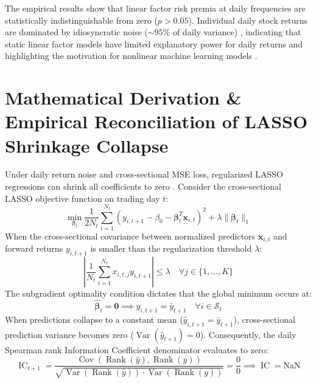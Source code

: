 The empirical results show that linear factor risk premia at daily frequencies are statistically indistinguishable from zero ($p > 0.05$). Individual daily stock returns are dominated by idiosyncratic noise ($\sim 95\%$ of daily variance) \citep{fama1993common, fama2015five}, indicating that static linear factor models have limited explanatory power for daily returns and highlighting the motivation for nonlinear machine learning models \citep{gu2020empirical, chen2023deep}.

\section{Mathematical Derivation \& Empirical Reconciliation of LASSO Shrinkage Collapse}
Under daily return noise and cross-sectional MSE loss, regularized LASSO regressions can shrink all coefficients to zero \citep{tibshirani1996regression, kozak2020shrinking}. Consider the cross-sectional LASSO objective function on trading day $t$:
\begin{equation}
\min_{\boldsymbol{\beta}_t} \frac{1}{2N_t} \sum_{i=1}^{N_t} \left( y_{i,t+1} - \beta_0 - \boldsymbol{\beta}_t^T \mathbf{x}_{i,t} \right)^2 + \lambda \|\boldsymbol{\beta}_t\|_1
\label{eq:ch4_lasso_obj}
\end{equation}
When the cross-sectional covariance between normalized predictors $\mathbf{x}_{i,t}$ and forward returns $y_{i,t+1}$ is smaller than the regularization threshold $\lambda$:
\begin{equation}
\left| \frac{1}{N_t} \sum_{i=1}^{N_t} x_{i,t,j} y_{i,t+1} \right| \le \lambda \quad \forall j \in \{1, \dots, K\}
\end{equation}
The subgradient optimality condition dictates that the global minimum occurs at:
\begin{equation}
\hat{\boldsymbol{\beta}}_t = \mathbf{0} \implies \hat{y}_{i,t+1} = \bar{y}_{t+1} \quad \forall i \in \mathcal{S}_t
\end{equation}
When predictions collapse to a constant mean ($\hat{y}_{i,t+1} = \bar{y}_{t+1}$), cross-sectional prediction variance becomes zero ($\operatorname{Var}(\hat{y}_{t+1}) = 0$). Consequently, the daily Spearman rank Information Coefficient denominator evaluates to zero:
\begin{equation}
\operatorname{IC}_{t+1} = \frac{\operatorname{Cov}(\operatorname{Rank}(\hat{y}), \operatorname{Rank}(y))}{\sqrt{\operatorname{Var}(\operatorname{Rank}(\hat{y})) \cdot \operatorname{Var}(\operatorname{Rank}(y))}} = \frac{0}{0} \implies \operatorname{IC} = \text{NaN}
\end{equation}

